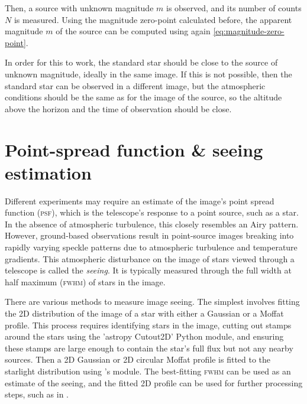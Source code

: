\documentclass[a4paper, 11pt, fleqn]{memoir}
\begin{document}
Then, a source with unknown magnitude $m$ is observed, and its number of counts $N$ is measured. Using the magnitude zero-point calculated before, the apparent magnitude $m$ of the source can be computed using again \cref{eq:magnitude-zero-point}.

In order for this to work, the standard star should be close to the source of unknown magnitude, ideally in the same image.
If this is not possible, then the standard star can be observed in a different image, but the atmospheric conditions should be the same as for the image of the source, so the altitude above the horizon and the time of observation should be close.



\section{Point-spread function \& seeing estimation}
\label{ssec:psf-seeing-estimation}

Different experiments may require an estimate of the image's point spread function (\textsc{psf}), which is the telescope's response to a point source, such as a star.
In the absence of atmospheric turbulence, this closely resembles an Airy pattern. 
However, ground-based observations result in point-source images breaking into rapidly varying speckle patterns due to atmospheric turbulence and temperature gradients.
This atmospheric disturbance on the image of stars viewed through a telescope is called the \emph{seeing}.
It is typically measured through the full width at half maximum (\textsc{fwhm}) of stars in the image.

There are various methods to measure image seeing.
The simplest involves fitting the 2D distribution of the image of a star with either a Gaussian or a Moffat profile.
This process requires identifying stars in the image, cutting out stamps around the stars using the 'astropy Cutout2D' Python module, and ensuring these stamps are large enough to contain the star's full flux but not any nearby sources.
Then a 2D Gaussian or 2D circular Moffat profile is fitted to the starlight distribution using 's  module.
The best-fitting \textsc{fwhm} can be used as an estimate of the seeing, and the fitted 2D profile can be used for further processing steps, such as in .


\end{document}
